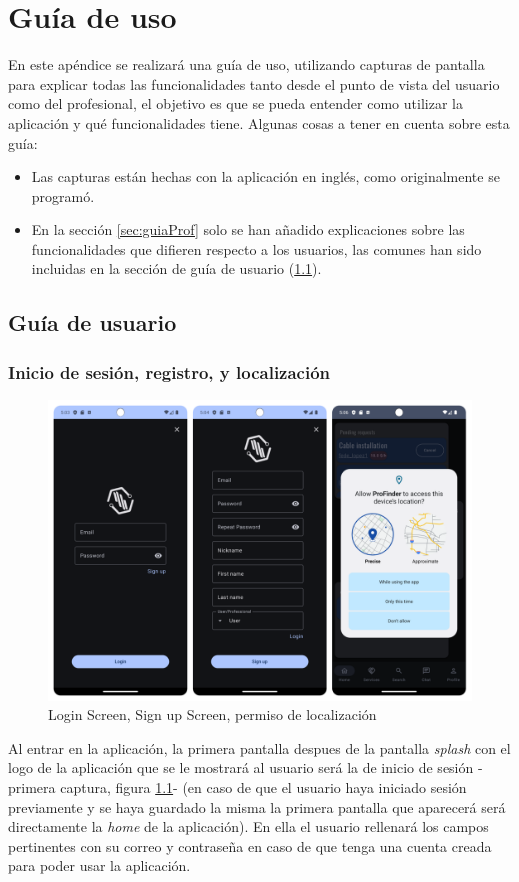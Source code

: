 \chapter{Guía de uso}
\label{Appendix:guiaUsuario}
En este apéndice se realizará una guía de uso, utilizando capturas de pantalla para explicar todas las funcionalidades tanto desde el punto de vista del usuario como del profesional, el objetivo es que se pueda entender como utilizar la aplicación y qué funcionalidades tiene. Algunas cosas a tener en cuenta sobre esta guía: 
\begin{itemize}
    \item Las capturas están hechas con la aplicación en inglés, como originalmente se programó.
    \item En la sección \ref{sec:guiaProf} solo se han añadido explicaciones sobre las funcionalidades que difieren respecto a los usuarios, las comunes han sido incluidas en la sección de guía de usuario (\ref{sec:guiaUser}).
\end{itemize}

\newpage
\section{Guía de usuario}
\label{sec:guiaUser}
\subsection{Inicio de sesión, registro, y localización}
\begin{figure}[h]
	\centering
	\includegraphics[width = 1\textwidth]{Imagenes/capturasApp/login_signup_local.png}
	\caption{Login Screen, Sign up Screen, permiso de localización}
	\label{fig:capApp1}
\end{figure}
Al entrar en la aplicación, la primera pantalla despues de la pantalla \textit{splash} con el logo de la aplicación que se le mostrará al usuario será la de inicio de sesión -primera captura, figura \ref{fig:capApp1}- (en caso de que el usuario haya iniciado sesión previamente y se haya guardado la misma la primera pantalla que aparecerá será directamente la \textit{home} de la aplicación). En ella el usuario rellenará los campos pertinentes con su correo y contraseña en caso de que tenga una cuenta creada para poder usar la aplicación.

